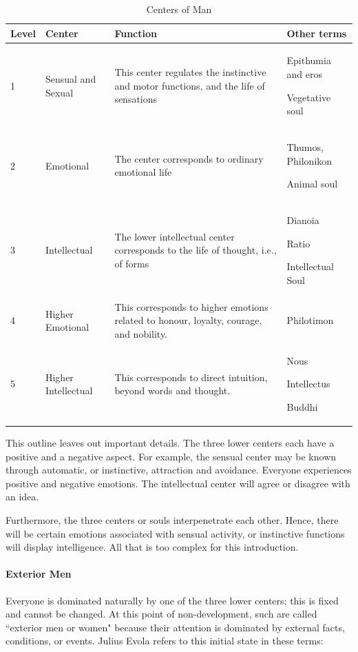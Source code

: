 \begin{table}[h]\small
\begin{tabularx}{\textwidth}{llXX}\toprule
Level &
Center &
Function &
Other terms\\\midrule
1 &
Sensual and Sexual &
This center regulates the instinctive and motor functions, and the life of sensations &
Epithumia and eros

Vegetative soul\\\midrule
2 &
Emotional &
The center corresponds to ordinary emotional life &
Thumos, Philonikon

Animal soul\\\midrule
3 &
Intellectual &
The lower intellectual center corresponds to the life of thought, i.e., of forms &
Dianoia

Ratio

Intellectual Soul\\\midrule
4 &
Higher Emotional &
This corresponds to higher emotions related to honour, loyalty, courage, and nobility. &
Philotimon\\\midrule
5 &
Higher Intellectual &
This corresponds to direct intuition, beyond words and thought. &
Nous

Intellectus

Buddhi\\\bottomrule
\end{tabularx}
\caption{Centers of Man}
\label{tab:CentersMan}
\end{table}
This outline leaves out important details. The three lower centers each have a positive and a negative aspect. For example, the sensual center may be known through automatic, or instinctive, attraction and avoidance. Everyone experiences positive and negative emotions. The intellectual center will agree or disagree with an idea.

Furthermore, the three centers or souls interpenetrate each other. Hence, there will be certain emotions associated with sensual activity, or instinctive functions will display intelligence. All that is too complex for this introduction.

\paragraph{Exterior Men}
Everyone is dominated naturally by one of the three lower centers; this is fixed and cannot be changed. At this point of non-development, such are called ``exterior men or women" because their attention is dominated by external facts, conditions, or events. Julius Evola refers to this initial state in these terms:

